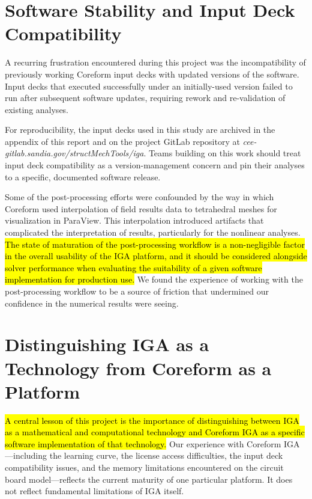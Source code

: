 \documentclass[12pt,report,justified]{SANDreport}
\begin{document}
\section{Software Stability and Input Deck Compatibility}

A recurring frustration encountered during this project was the incompatibility of
previously working Coreform input decks with updated versions of the software.  Input
decks that executed successfully under an initially-used version
failed to run after
subsequent software updates, requiring rework and re-validation of existing analyses.

For reproducibility, the input decks used in this study are archived in the appendix of
this report and on the project GitLab repository at
{\em cee-gitlab.sandia.gov/structMechTools/iga}.  Teams building on this work should
treat input deck compatibility as a version-management concern and pin their analyses to
a specific, documented software release.

Some of the post-processing efforts were confounded by the way in which Coreform used interpolation of field results data to tetrahedral meshes for visualization in ParaView.  This interpolation introduced artifacts that complicated the interpretation of results, particularly for the nonlinear analyses.  \hl{The state of maturation of the post-processing workflow is a non-negligible factor in the overall usability of the IGA platform, and it should be considered alongside solver performance when evaluating the suitability of a given software implementation for production use.}  We found the experience of working with the post-processing workflow to be a source of friction that undermined our confidence in the numerical results were seeing.

\section{Distinguishing IGA as a Technology from Coreform as a Platform}

\hl{A central lesson of this project is the importance of distinguishing between IGA as a
mathematical and computational technology and Coreform IGA as a specific software
implementation of that technology.}  Our experience with Coreform IGA---including the
learning curve, the license access difficulties, the input deck compatibility issues,
and the memory limitations encountered on the circuit board model---reflects the current
maturity of one particular platform.  It does not reflect fundamental limitations of IGA
itself.
\end{document}
